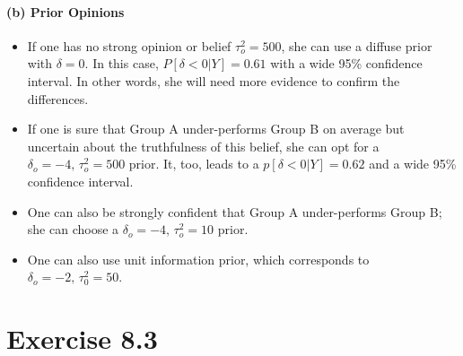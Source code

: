 \documentclass[11pt, letterpaper]{article}
\begin{document}
\paragraph{(b) Prior Opinions}
\begin{itemize}
    \item If one has no strong opinion or belief $\tau^2_o=500$, she can use a diffuse prior with $\delta=0$. In this case, $P[\delta<0|Y] = 0.61$ with a wide 95\% confidence interval. In other words, she will need more evidence to confirm the differences.
    \item If one is sure that Group A under-performs Group B on average but uncertain about the truthfulness of this belief, she can opt for a $\delta_o=-4, \, \tau^2_o=500$ prior. It, too, leads to a $p[\delta<0|Y] = 0.62$ and a wide 95\% confidence interval.
    \item One can also be strongly confident that Group A under-performs Group B; she can choose a $\delta_o=-4, \, \tau_o^2=10$ prior.
    \item One can also use unit information prior, which corresponds to $\delta_o=-2, \, \tau_0^2=50$.
\end{itemize}



\section{Exercise 8.3}
\end{document}
